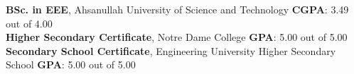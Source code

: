 %
%
%


\begin{scholarship}
					{\textbf{BSc. in EEE},  Ahsanullah University of Science and Technology}
	\scholarshipentry{}
					{\textbf{CGPA}: 3.49 out of 4.00}\\
					{\textbf{Higher Secondary Certificate}, Notre Dame College}
	\scholarshipentry{}
					{\textbf{GPA}: 5.00 out of 5.00}\\
					{\textbf{Secondary School Certificate}, Engineering University Higher Secondary School}
	\scholarshipentry{}
					{\textbf{GPA}: 5.00 out of 5.00}\\
					
\end{scholarship}